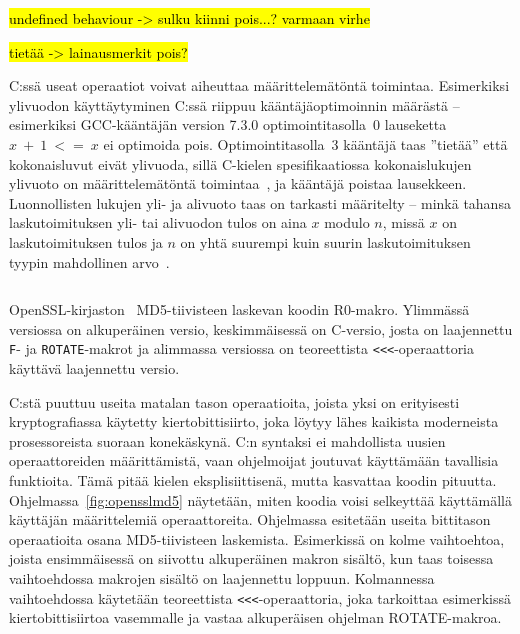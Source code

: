 \hl{undefined behaviour -> sulku kiinni pois...? varmaan virhe}

\hl{tietää -> lainausmerkit pois?}

C:ssä useat operaatiot voivat aiheuttaa määrittelemätöntä
toimintaa. Esimerkiksi ylivuodon käyttäytyminen
C:ssä riippuu kääntäjäoptimoinnin määrästä -- esimerkiksi GCC-kääntäjän version
7.3.0 optimointitasolla~0 lauseketta $x~+~1~<=~x$ ei optimoida pois.
Optimointitasolla~3 kääntäjä taas ''tietää'' että kokonaisluvut eivät ylivuoda,
sillä \mbox{C-kielen} spesifikaatiossa kokonaislukujen ylivuoto on
määrittelemätöntä toimintaa~\citep[liite J, luku J.2]{C18}, ja kääntäjä poistaa
lausekkeen. Luonnollisten lukujen yli- ja alivuoto taas on tarkasti määritelty
-- minkä tahansa laskutoimituksen yli- tai alivuodon tulos on aina $x$ modulo
$n$, missä $x$ on laskutoimituksen tulos ja $n$ on yhtä suurempi kuin suurin
laskutoimituksen tyypin mahdollinen arvo~\citep[luku 6.2.5]{C18}.

\begin{listing}[ht!]
    \inputminted{C}{openssl_md5.c}

    \caption{OpenSSL-kirjaston~\citep{openssl} MD5-tiivisteen laskevan koodin
    R0-makro. Ylimmässä versiossa on alkuperäinen versio, keskimmäisessä on
    C-versio, josta on laajennettu \texttt{F}- ja \texttt{ROTATE}-makrot ja
    alimmassa versiossa on teoreettista \texttt{<<<}-operaattoria käyttävä
    laajennettu versio.}

    \label{fig:opensslmd5}
\end{listing}

C:stä puuttuu useita matalan tason operaatioita, joista yksi on erityisesti
kryptografiassa käytetty kiertobittisiirto, joka
löytyy lähes kaikista moderneista prosessoreista suoraan konekäskynä.
C:n syntaksi ei mahdollista uusien operaattoreiden määrittämistä, vaan
ohjelmoijat joutuvat käyttämään tavallisia funktioita. Tämä pitää kielen
eksplisiittisenä, mutta kasvattaa koodin pituutta.
Ohjelmassa~\ref{fig:opensslmd5} näytetään, miten koodia voisi selkeyttää
käyttämällä käyttäjän määrittelemiä operaattoreita. Ohjelmassa esitetään useita
bittitason operaatioita osana MD5-tiivisteen laskemista. Esimerkissä on kolme
vaihtoehtoa, joista ensimmäisessä on siivottu alkuperäinen makron sisältö, kun
taas toisessa vaihtoehdossa makrojen sisältö on laajennettu loppuun.
Kolmannessa vaihtoehdossa käytetään teoreettista \texttt{<<<}-operaattoria,
joka tarkoittaa esimerkissä kiertobittisiirtoa vasemmalle ja vastaa
alkuperäisen ohjelman ROTATE-makroa.

